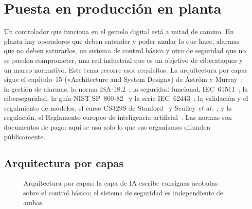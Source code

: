 \chapter{Puesta en producción en planta}
\label{tema:6}

Un controlador que funciona en el gemelo digital está a mitad de camino. En planta hay operadores que deben entender y poder anular lo que hace, alarmas que no deben saturarlos, un sistema de control básico y otro de seguridad que no se pueden comprometer, una red industrial que es un objetivo de ciberataques y un marco normativo. Este tema recorre esos requisitos. La arquitectura por capas sigue el capítulo~15 («Architecture and System Design») de Åström y Murray~\cite{am}; la gestión de alarmas, la norma ISA-18.2~\cite{isa182}; la seguridad funcional, IEC~61511~\cite{iec61511}; la ciberseguridad, la guía NIST SP~800-82~\cite{nist} y la serie IEC~62443~\cite{iec62443}; la validación y el seguimiento de modelos, el curso CS329S de Stanford~\cite{cs329s} y Sculley \emph{et al.}~\cite{sculley}, y la regulación, el Reglamento europeo de inteligencia artificial~\cite{aiact}. Las normas son documentos de pago: aquí se usa solo lo que sus organismos difunden públicamente.

\section{Arquitectura por capas}

\begin{figure}[h]
\centering
{}
\caption{Arquitectura por capas: la capa de IA escribe consignas acotadas sobre el control básico; el sistema de seguridad es independiente de ambas.}
\label{fig:capas}
\end{figure}

